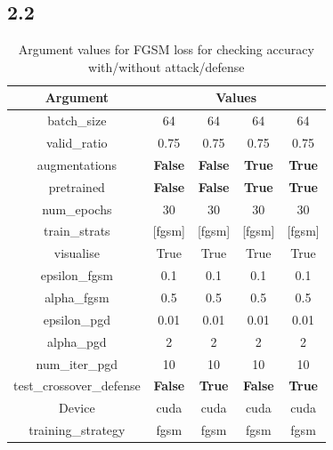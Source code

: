 \documentclass{article}
\begin{document}
\subsection*{2.2}

\begin{table}[H]
    \centering
    \begin{tabular}{|c|c|c|c|c|}
    \hline
    \textbf{Argument} & \multicolumn{4}{|c|}{\textbf{Values}} \\
    \hline
    batch\_size & 64 & 64 & 64 & 64 \\
    valid\_ratio & 0.75 & 0.75 & 0.75 & 0.75 \\
    augmentations & \textbf{False} & \textbf{False} & \textbf{True} & \textbf{True} \\
    pretrained & \textbf{False} & \textbf{False} & \textbf{True} & \textbf{True} \\
    num\_epochs & 30 & 30 & 30 & 30 \\
    train\_strats & [fgsm] & [fgsm] & [fgsm] & [fgsm] \\
    visualise & True & True & True & True \\
    epsilon\_fgsm & 0.1 & 0.1 & 0.1 & 0.1 \\
    alpha\_fgsm & 0.5 & 0.5 & 0.5 & 0.5 \\
    epsilon\_pgd & 0.01 & 0.01 & 0.01 & 0.01 \\
    alpha\_pgd & 2 & 2 & 2 & 2 \\
    num\_iter\_pgd & 10 & 10 & 10 & 10 \\
    test\_crossover\_defense & \textbf{False} & \textbf{True} & \textbf{False} & \textbf{True} \\
    Device & cuda & cuda & cuda & cuda \\
    training\_strategy & fgsm & fgsm & fgsm & fgsm \\
    \hline
    \end{tabular}
    \caption{Argument values for FGSM loss for checking accuracy with/without attack/defense}
\end{table}
\end{document}
